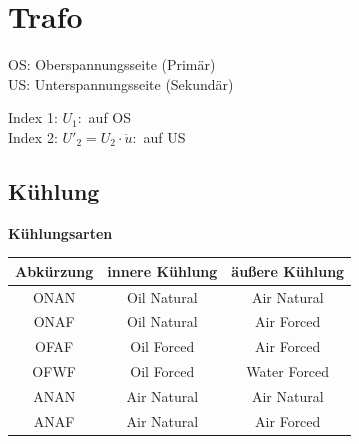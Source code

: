 \section{Trafo}
    OS:  Oberspannungsseite (Primär)\\
    US:  Unterspannungsseite (Sekundär)

    Index 1: \(U_1:\) auf OS\\
    Index 2: \(U'_2 = U_2 \cdot \ddot{u}:\) auf US

\subsection{Kühlung}
    \textbf{Kühlungsarten}
    \vspace{-6pt}
    \begin{table}[H]
        \begin{tabular}{c|c|c}
            \textbf{Abkürzung} & \textbf{innere Kühlung} & \textbf{äußere Kühlung}\\
            \hline
            ONAN & Oil Natural & Air Natural\\
            ONAF & Oil Natural & Air Forced \\
            OFAF & Oil Forced & Air Forced\\
            OFWF & Oil Forced & Water Forced\\
            ANAN & Air Natural & Air Natural\\
            ANAF & Air Natural & Air Forced\\
        \end{tabular}
    \end{table}
    
